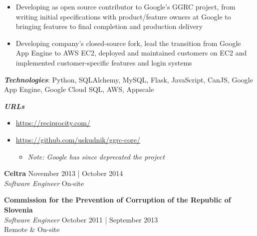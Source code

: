 \documentclass[a4paper]{article}
\newenvironment{jobdetails}%
    {\list{}{\leftmargin=4mm}\item[]}%
    {\endlist}
\begin{document}
\begin{jobdetails}
\begin{itemize}
    \item Developing as open source contributor to Google’s GGRC project, from writing initial specifications
    with product/feature owners at Google to bringing features to final completion and production delivery
    \item Developing company’s closed-source fork, lead the transition from Google App Engine to AWS EC2,
    deployed and maintained customers on EC2 and implemented customer-specific features and login systems   
\end{itemize}
\vspace{2mm}

\textbf{\textit{Technologies}}: Python, SQLAlchemy, MySQL, Flask, JavaScript, CanJS, Google App Engine, Google Cloud SQL,
AWS, Appscale
\vspace{2mm}

\textbf{\textit{URLs}}
\begin{itemize} \itemsep 1pt
	\item \url{https://reciprocity.com/}
	\item \url{https://github.com/uskudnik/ggrc-core/}
	\begin{itemize}
        \item {\it Note: Google has since deprecated the project}
    \end{itemize}
\end{itemize}

\end{jobdetails}
\vspace{1mm}


\pagebreak




\textbf{Celtra} \hfill November 2013 | October 2014 \\
\textit{Software Engineer} \hfill On-site \\
\vspace{2mm}



\textbf{Commission for the Prevention of Corruption of
the Republic of Slovenia}\\
\textit{Software Engineer} \hfill October 2011 | September 2013 \\
\hfill Remote \& On-site \\
\vspace{2mm}
\end{document}

